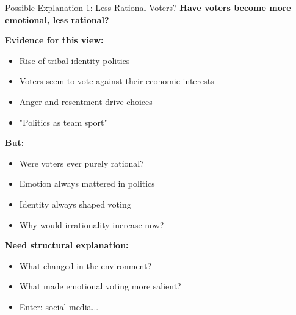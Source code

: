 \documentclass[10pt]{beamer}
\begin{document}
\begin{frame}[allowframebreaks]{Possible Explanation 1: Less Rational Voters?}
\textbf{Have voters become more emotional, less rational?}



\textbf{Evidence for this view:}
\begin{itemize}
\item Rise of tribal identity politics
\item Voters seem to vote against their economic interests
\item Anger and resentment drive choices
\item "Politics as team sport"
\end{itemize}



\textbf{But:}
\begin{itemize}
\item Were voters ever purely rational?
\item Emotion always mattered in politics
\item Identity always shaped voting
\item \alert{Why would irrationality increase now?}
\end{itemize}

 \framebreak   

\textbf{Need structural explanation:}
\begin{itemize}
\item What changed in the environment?
\item What made emotional voting more salient?
\item Enter: social media...
\end{itemize}
\end{frame}
\end{document}
